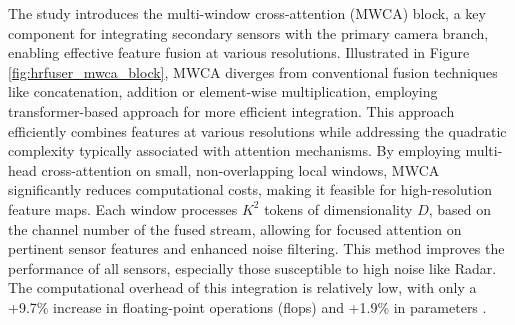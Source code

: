 \documentclass[report.tex]{subfiles}
\begin{document}





    The study introduces the multi-window cross-attention (MWCA) block, a key component for integrating secondary sensors with the primary camera branch, enabling effective feature fusion at various resolutions. Illustrated in Figure \ref{fig:hrfuser_mwca_block}, MWCA diverges from conventional fusion techniques like concatenation, addition or element-wise multiplication, employing transformer-based approach for more efficient integration. This approach efficiently combines features at various resolutions while addressing the quadratic complexity typically associated with attention mechanisms. By employing multi-head cross-attention on small, non-overlapping local windows, MWCA significantly reduces computational costs, making it feasible for high-resolution feature maps. Each window processes \( K^2 \) tokens of dimensionality ${D}$, based on the channel number of the fused stream, allowing for focused attention on pertinent sensor features and enhanced noise filtering. This method improves the performance of all sensors, especially those susceptible to high noise like Radar. The computational overhead of this integration is relatively low, with only a +9.7\% increase in floating-point operations (flops) and +1.9\% in parameters \cite{broedermann2022hrfuser}.
\end{document}
